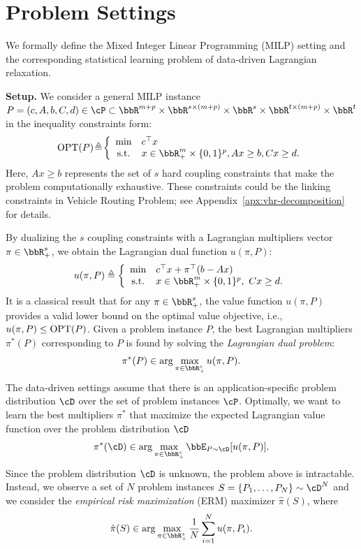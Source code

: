 \documentclass{article}
\theoremstyle{plain}
\theoremstyle{definition}
\theoremstyle{remark}
\begin{document}
\section{Problem Settings} \label{sec:settings}
We formally define the Mixed Integer Linear Programming (MILP) setting and the corresponding statistical learning problem of data-driven Lagrangian relaxation.

\textbf{Setup.} We consider a general MILP instance $P = (c, A, b, C, d) \in \cP \subset \bbR^{m + p} \times \bbR^{s \times (m + p)} \times \bbR^s \times \bbR^{t \times (m + p)} \times \bbR^t$ in the inequality constraints form: 
\begin{equation*} %
    \textup{OPT}(P)\!\triangleq\!
    \left\{
    \begin{array}{cl}       \min &c^\top x \\
        \text{s.t.} &x\in \bbR_+^{m} \times \{0, 1\}^p,Ax \geq b,Cx \geq d.
    \end{array}
    \right.
\end{equation*}
Here, $Ax \geq b$ represents the set of $s$ hard coupling constraints that make the problem computationally exhaustive. These constraints could be the linking constraints in Vehicle Routing Problem; see Appendix~\ref{apx:vhr-decomposition} for details. 

By dualizing the $s$ coupling constraints with a Lagrangian multipliers vector $\pi \in \bbR^s_+$, we obtain the Lagrangian dual function $u(\pi, P)$:
\begin{equation*}
u(\pi, P) \triangleq \left\{
    \begin{array}{cl}
        \min &c^\top x + \pi^\top (b - Ax) \\
        \textup{s.t.} &x \in \bbR^m_+ \times \{0, 1\}^p,~Cx \geq d.
     \end{array}
     \right.
\end{equation*}
It is a classical result that for any $\pi \in \bbR^s_+$, the value function $u(\pi, P)$ provides a valid lower bound on the optimal value objective, i.e., $u(\pi, P) \leq \textup{OPT}(P)$. Given a problem instance $P$, the best Lagrangian multipliers $\pi^*(P)$ corresponding to $P$ is found by solving the \textit{Lagrangian dual problem}:
\[
    \pi^*(P) \in \arg \max_{\pi \in \bbR^s_{+}} u(\pi, P).
\]
The data-driven settings assume that there is an application-specific problem distribution $\cD$ over the set of problem instances $\cP$. Optimally, we want to learn the best multipliers $\pi^*$ that maximize the expected Lagrangian value function over the problem distribution $\cD$
\[
    \pi^*(\cD) \in \arg\max_{\pi \in \bbR^s_+} \bbE_{P \sim \cD} [u(\pi, P)].
\]
Since the problem distribution $\cD$ is unknown, the problem above is intractable. Instead, we observe a set of $N$ problem instances $S = \{P_1, \dots, P_N\} \sim \cD^N$  and we consider the \textit{empirical risk maximization} (ERM) maximizer $\hat{\pi}(S)$, where
\[
    \hat{\pi}(S) \in \arg\max_{\pi \in \bbR_+^s}\frac{1}{N}\sum_{i = 1}^N u(\pi, P_i).
\]
\end{document}
